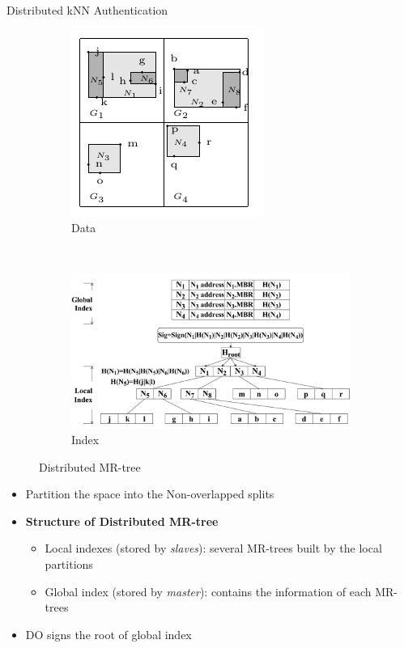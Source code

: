 \documentclass[xcolor={dvipsnames},aspectratio=169,10pt]{beamer}
\begin{document}
\begin{frame}{Distributed kNN Authentication}
  \vspace{-2ex}
  \begin{figure}
    \centering
    \begin{subfigure}[b]{.35\linewidth}
      \centering
      \includegraphics[width=.7\linewidth]{figs/knn/distributed-mrtree-data.pdf}
      \caption{Data}
    \end{subfigure}~%
    \begin{subfigure}[b]{.65\linewidth}
      \centering
      \includegraphics[width=.7\linewidth]{figs/knn/distributed-mrtree-tree.pdf}
      \caption{Index}
    \end{subfigure}
    \caption{Distributed MR-tree}
  \end{figure}
  \vspace{-2ex}
  \begin{itemize}[<+->]
    \item Partition the space into the Non-overlapped splits
    \item \textbf{Structure of Distributed MR-tree}
      \begin{itemize}[<1->]
        \item \alert{Local indexes} (stored by \emph{slaves}): several MR-trees built by the local partitions
        \item \alert{Global index} (stored by \emph{master}): contains the information of each MR-trees
      \end{itemize}
    \item DO signs the root of global index
  \end{itemize}
\end{frame}
\end{document}
